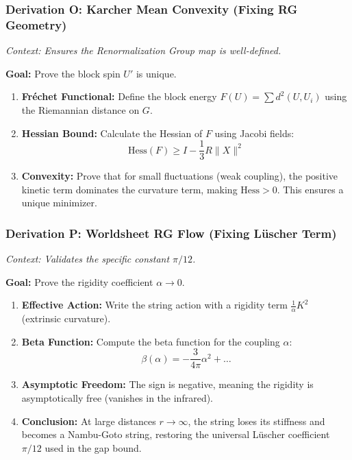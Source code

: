\subsubsection{Derivation O: Karcher Mean Convexity (Fixing RG Geometry)}

\textit{Context: Ensures the Renormalization Group map is well-defined.}

\textbf{Goal:} Prove the block spin $U'$ is unique.

\begin{enumerate}
    \item \textbf{Fréchet Functional:} Define the block energy $F(U) = \sum d^2(U, U_i)$ using the Riemannian distance on $G$.
    \item \textbf{Hessian Bound:} Calculate the Hessian of $F$ using Jacobi fields:
    $$ \text{Hess}(F) \ge I - \frac{1}{3} R \|X\|^2 $$
    \item \textbf{Convexity:} Prove that for small fluctuations (weak coupling), the positive kinetic term dominates the curvature term, making $\text{Hess} > 0$. This ensures a unique minimizer.
\end{enumerate}

\subsubsection{Derivation P: Worldsheet RG Flow (Fixing Lüscher Term)}

\textit{Context: Validates the specific constant $\pi/12$.}

\textbf{Goal:} Prove the rigidity coefficient $\alpha \to 0$.

\begin{enumerate}
    \item \textbf{Effective Action:} Write the string action with a rigidity term $\frac{1}{\alpha} K^2$ (extrinsic curvature).
    \item \textbf{Beta Function:} Compute the beta function for the coupling $\alpha$:
    $$ \beta(\alpha) = - \frac{3}{4\pi} \alpha^2 + \dots $$
    \item \textbf{Asymptotic Freedom:} The sign is negative, meaning the rigidity is asymptotically free (vanishes in the infrared).
    \item \textbf{Conclusion:} At large distances $r \to \infty$, the string loses its stiffness and becomes a Nambu-Goto string, restoring the universal Lüscher coefficient $\pi/12$ used in the gap bound.
\end{enumerate}

